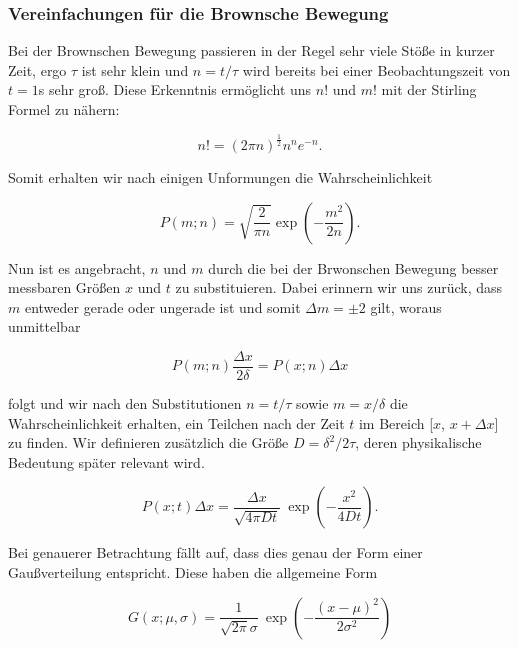 \documentclass{article}
\begin{document}
\subsubsection{Vereinfachungen für die Brownsche Bewegung}

Bei der Brownschen Bewegung passieren in der Regel sehr viele Stöße in kurzer Zeit, ergo $\tau$ ist sehr klein und $n=t/\tau$ wird bereits bei einer Beobachtungszeit von $t=1$s sehr groß. Diese Erkenntnis ermöglicht uns $n!$ und $m!$ mit der Stirling Formel zu nähern:

\begin{equation}
    n! = (2 \pi n)^\frac{1}{2} n^n e^{-n}.
\end{equation}

Somit erhalten wir nach einigen Unformungen die Wahrscheinlichkeit

\begin{equation}
    P(m;n) = \sqrt{\frac{2}{\pi n}} \exp{\left( - \frac{m^2}{2n} \right)}.
\end{equation}

Nun ist es angebracht, $n$ und $m$ durch die bei der Brwonschen Bewegung besser messbaren Größen $x$ und $t$ zu substituieren. Dabei erinnern wir uns zurück, dass $m$ entweder gerade oder ungerade ist und somit $\Delta m = \pm 2$ gilt, woraus unmittelbar

\begin{equation}
    P(m;n) \frac{\Delta x}{2 \delta} = P(x;n) \Delta x
\end{equation}

folgt und wir nach den Substitutionen $n = t/\tau$ sowie $m = x/\delta$ die Wahrscheinlichkeit erhalten, ein Teilchen nach der Zeit $t$ im Bereich [$x$, $x+\Delta x$] zu finden. Wir definieren zusätzlich die Größe $D = \delta^2 / 2 \tau$, deren physikalische Bedeutung später relevant wird. 

\begin{equation}
    P(x;t) \Delta x = \frac{\Delta x}{\sqrt{4 \pi D t}} \ \exp{\left( - \frac{x^2}{4Dt} \right)}.
\end{equation}

Bei genauerer Betrachtung fällt auf, dass dies genau der Form einer Gaußverteilung entspricht. Diese haben die allgemeine Form

\begin{equation}
    G(x; \mu, \sigma) = \frac{1}{\sqrt{2 \pi} \sigma} \ \exp{\left( - \frac{(x-\mu)^2}{2\sigma^2} \right)}
\end{equation}
\end{document}
